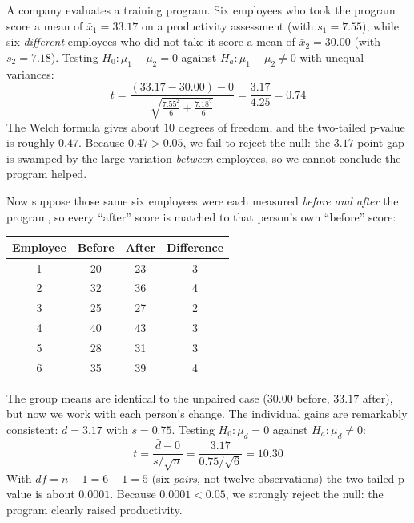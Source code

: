 \documentclass[
  11pt,
  letterpaper,
  DIV=11,
  numbers=noendperiod,
  oneside,
  open=any]{scrreprt}
\begin{document}
\begin{bsexample}

A company evaluates a training program. Six employees who took the
program score a mean of \(\bar{x}_1 = 33.17\) on a productivity
assessment (with \(s_1 = 7.55\)), while six \emph{different} employees
who did not take it score a mean of \(\bar{x}_2 = 30.00\) (with
\(s_2 = 7.18\)). Testing \(H_0: \mu_1 - \mu_2 = 0\) against
\(H_a: \mu_1 - \mu_2 \ne 0\) with unequal variances:
\[t = \frac{(33.17 - 30.00) - 0}{\sqrt{\frac{7.55^2}{6} + \frac{7.18^2}{6}}} = \frac{3.17}{4.25} = 0.74\]
The Welch formula gives about \(10\) degrees of freedom, and the
two-tailed p-value is roughly \(0.47\). Because \(0.47 > 0.05\), we fail
to reject the null: the \(3.17\)-point gap is swamped by the large
variation \emph{between} employees, so we cannot conclude the program
helped.

\end{bsexample}

\begin{bsexample}

Now suppose those same six employees were each measured \emph{before and
after} the program, so every ``after'' score is matched to that person's
own ``before'' score:

\begin{center}
\begin{tabular}{cccc}
\toprule
Employee & Before & After & Difference \\
\midrule
1 & 20 & 23 & 3 \\
2 & 32 & 36 & 4 \\
3 & 25 & 27 & 2 \\
4 & 40 & 43 & 3 \\
5 & 28 & 31 & 3 \\
6 & 35 & 39 & 4 \\
\bottomrule
\end{tabular}
\end{center}

The group means are identical to the unpaired case (\(30.00\) before,
\(33.17\) after), but now we work with each person's change. The
individual gains are remarkably consistent: \(\bar{d} = 3.17\) with
\(s = 0.75\). Testing \(H_0: \mu_d = 0\) against \(H_a: \mu_d \ne 0\):
\[t = \frac{\bar{d} - 0}{s / \sqrt{n}} = \frac{3.17}{0.75 / \sqrt{6}} = 10.30\]
With \(df = n - 1 = 6 - 1 = 5\) (six \emph{pairs}, not twelve
observations) the two-tailed p-value is about \(0.0001\). Because
\(0.0001 < 0.05\), we strongly reject the null: the program clearly
raised productivity.

\end{bsexample}
\end{document}
